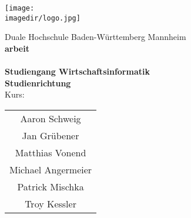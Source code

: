 \begin{titlepage}
	\begin{center}
		\texttt{[image: \\imagedir/logo.jpg]}	
	\end{center}
	\vspace{2em}
	\begin{center}
		{\textsf{\large Duale Hochschule Baden-W\"urttemberg Mannheim}}\\[4em]
		{\textsf{\textbf{\large{\DieArtDerArbeit}arbeit}}}\\[6mm]
		{\textsf{\textbf{\Large{}\DerTitelDerArbeit}}} \\[1.5cm]
		{\textsf{\textbf{\large{}Studiengang Wirtschaftsinformatik}}\\[6mm]
		\textsf{\textbf{Studienrichtung \DieStudienrichtung}}}\\[6mm]
		\textsf{Kurs: \DieKursbezeichnung} \\[3cm]
		\begin{center}
			\begin{table}[h]
				\centering
				\begin{tabular}{c}
					Aaron Schweig \\
					Jan Grübener \\
					Matthias Vonend  \\
					Michael Angermeier \\
					Patrick Mischka \\
					Troy Kessler \\
				\end{tabular}
			\end{table}
		\end{center}

	\end{center}
\end{titlepage}